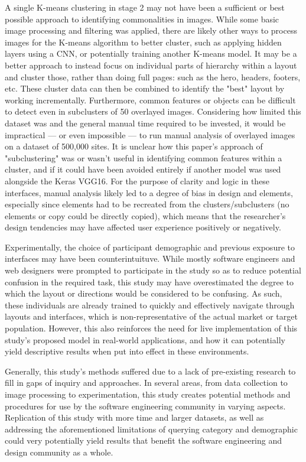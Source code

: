 A single K-means clustering in stage 2 may not have been a sufficient or best possible approach to identifying commonalities in images. While some basic image processing and filtering was applied, there are likely other ways to process images for the K-means algorithm to better cluster, such as applying hidden layers using a CNN, or potentially training another K-means model. It may be a better approach to instead focus on individual parts of hierarchy within a layout and cluster those, rather than doing full pages: such as the hero, headers, footers, etc. These cluster data can then be combined to identify the "best" layout by working incrementally. Furthermore, common features or objects can be difficult to detect even in subclusters of 50 overlayed images. Considering how limited this dataset was and the general manual time required to be invested, it would be impractical — or even impossible — to run manual analysis of overlayed images on a dataset of 500,000 sites. It is unclear how this paper's approach of "subclustering" was or wasn't useful in identifying common features within a cluster, and if it could have been avoided entirely if another model was used alongside the Keras VGG16. For the purpose of clarity and logic in these interfaces, manual analysis likely led to a degree of bias in design and elements, especially since elements had to be recreated from the clusters/subclusters (no elements or copy could be directly copied), which means that the researcher's design tendencies may have affected user experience positively or negatively.

Experimentally, the choice of participant demographic and previous exposure to interfaces may have been counterintuituve. While mostly software engineers and web designers were prompted to participate in the study so as to reduce potential confusion in the required task, this study may have overestimated the degree to which the layout or directions would be considered to be confusing. As such, these individuals are already trained to quickly and effectively navigate through layouts and interfaces, which is non-representative of the actual market or target population. However, this also reinforces the need for live implementation of this study's proposed model in real-world applications, and how it can potentially yield descriptive results when put into effect in these environments.

Generally, this study's methods suffered due to a lack of pre-existing research to fill in gaps of inquiry and approaches. In several areas, from data collection to image processing to experimentation, this study creates potential methods and procedures for use by the software engineering community in varying aspects. Replication of this study with more time and larger datasets, as well as addressing the aforementioned limitations of querying category and demographic could very potentially yield results that benefit the software engineering and design community as a whole.

